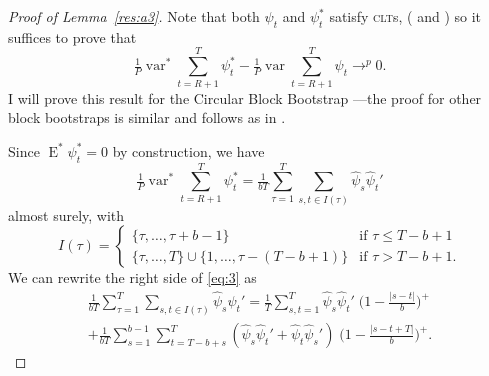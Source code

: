 \documentclass[11pt,fleqn]{article}
\theoremstyle{definition}
\DeclareMathOperator{\E}{E}
\DeclareMathOperator{\var}{var}
\newcommand{\osum}[1]{\sum_{#1=R+1}^T}
\newcommand{\clt}{\textsc{clt}}
\begin{document}
\begin{proof}[Proof of Lemma~\ref{res:a3}]
  Note that both $\psi_t$ and $\psi_t^*$ satisfy
  \clt s, (\citealp[Theorem~2]{Jon:97} and
  \citealp[Theorem~1]{Cal:13}) so it suffices to prove that
  \[ \tfrac{ 1 }{ P } \var^* \osum{t} \psi_t^* 
  - \tfrac{ 1 }{ P } \var \osum{t} \psi_t \to^p
  0. \] I will prove this result for the Circular Block Bootstrap
  \citep{PoR:92}---the proof for other block bootstraps is similar and
  follows as in \cite{Cal:13}.

  \newcommand{\su}{\tfrac{ 1 }{ b T } \sum_{ \tau = 1 }^{ T }%
  \sum_{ s, t \in I( \tau ) }}

  Since $\E^* \psi_t^* = 0$ by construction, we have
  \begin{equation}\label{eq:3}
  \tfrac{ 1 }{ P } \var^* \sum_{ t = R + 1 }^T \psi_t^*
  = \su \hat \psi_s \hat \psi_t'
  \end{equation}
  almost surely, with
  \begin{equation*}
    I(\tau) =
    \begin{cases}
      \{ \tau, \dots, \tau + b - 1 \} & \text{if } \tau \leq T - b + 1 \\
      \{ \tau, \dots, T \} \cup \{ 1, \dots, \tau - ( T - b + 1 ) \}
      & \text{if } \tau > T - b + 1.
    \end{cases}
  \end{equation*}
  We can rewrite the right side of \eqref{eq:3} as
  \begin{multline}\label{eq:6}
    \su \hat\psi_s \hat\psi_t'
    = \tfrac{1}{T} \sum_{s,t=1}^T \hat\psi_s \hat\psi_t' \;
      \big(1 - \tfrac{\lvert s - t \rvert}{b}\big)^+ \\
      + \tfrac{1}{bT} \sum_{s = 1}^{b - 1} \sum_{t = T - b + s}^{T}
        (\hat\psi_s \hat\psi_t' +
         \hat\psi_t \hat\psi_s') \;
        \big(1 - \tfrac{\lvert s - t + T\rvert}{b}\big)^+.
  \end{multline}


\end{proof}
\end{document}
